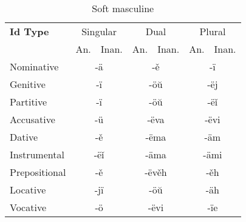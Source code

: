 \begin{table}[!htb]
	\caption{Soft masculine}
	\begin{tabular}{lllllll}
		\textbf{Id Type}       
		& \multicolumn{2}{c}{Singular} 
		& \multicolumn{2}{c}{Dual} 
		& \multicolumn{2}{c}{Plural} \\
		& An.   & Inan.  & An.   & Inan.   & An.  & Inan. \\
		Nominative    & \multicolumn{2}{c}{-ä}      
		& \multicolumn{2}{c}{-ě}        
		& \multicolumn{2}{c}{-ï} \\
		Genitive      & \multicolumn{2}{c}{-ï}       
		& \multicolumn{2}{c}{-öŭ}      
		& \multicolumn{2}{c}{-ëj}   \\
		Partitive     & \multicolumn{2}{c}{-ï}       
		& \multicolumn{2}{c}{-öŭ}      
		& \multicolumn{2}{c}{-ëǐ} \\
		Accusative    & \multicolumn{2}{c}{-ü}       
		& \multicolumn{2}{c}{-ëva}
		& \multicolumn{2}{c}{-ëvi} \\
		Dative        & \multicolumn{2}{c}{-ě}       
		& \multicolumn{2}{c}{-ëma}     
		& \multicolumn{2}{c}{-äm} \\
		Instrumental  & \multicolumn{2}{c}{-ëǐ}     
		& \multicolumn{2}{c}{-äma}     
		& \multicolumn{2}{c}{-ämi} \\
		Prepositional & \multicolumn{2}{c}{-ě}       
		& \multicolumn{2}{c}{-ëvěh}     
		& \multicolumn{2}{c}{-ěh} \\
		Locative      & \multicolumn{2}{c}{-jï}      
		& \multicolumn{2}{c}{-öŭ}       
		& \multicolumn{2}{c}{-äh} \\ 
		Vocative      & \multicolumn{2}{c}{-ö}       
		& \multicolumn{2}{c}{-ëvi}      
		& \multicolumn{2}{c}{-ïe}
	\end{tabular}
\end{table}

